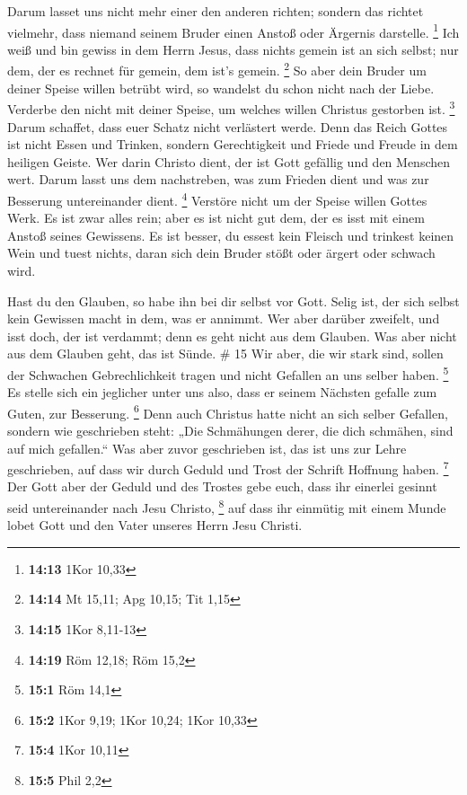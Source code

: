  Darum lasset uns nicht mehr einer den anderen richten;
sondern das richtet vielmehr, dass niemand seinem Bruder einen Anstoß
oder Ärgernis darstelle. \footnote{\textbf{14:13} 1Kor 10,33}
 Ich weiß und bin gewiss in dem Herrn Jesus, dass nichts
gemein ist an sich selbst; nur dem, der es rechnet für gemein, dem ist's
gemein. \footnote{\textbf{14:14} Mt 15,11; Apg 10,15; Tit 1,15}
 So aber dein Bruder um deiner Speise willen betrübt
wird, so wandelst du schon nicht nach der Liebe. Verderbe den nicht mit
deiner Speise, um welches willen Christus gestorben ist. \footnote{\textbf{14:15}
  1Kor 8,11-13}  Darum schaffet, dass euer Schatz nicht
verlästert werde.  Denn das Reich Gottes ist nicht Essen
und Trinken, sondern Gerechtigkeit und Friede und Freude in dem heiligen
Geiste.  Wer darin Christo dient, der ist Gott gefällig
und den Menschen wert.  Darum lasst uns dem nachstreben,
was zum Frieden dient und was zur Besserung untereinander dient.
\footnote{\textbf{14:19} Röm 12,18; Röm 15,2}  Verstöre
nicht um der Speise willen Gottes Werk. Es ist zwar alles rein; aber es
ist nicht gut dem, der es isst mit einem Anstoß seines Gewissens.
 Es ist besser, du essest kein Fleisch und trinkest
keinen Wein und tuest nichts, daran sich dein Bruder stößt oder ärgert
oder schwach wird.

 Hast du den Glauben, so habe ihn bei dir selbst vor
Gott. Selig ist, der sich selbst kein Gewissen macht in dem, was er
annimmt.  Wer aber darüber zweifelt, und isst doch, der
ist verdammt; denn es geht nicht aus dem Glauben. Was aber nicht aus dem
Glauben geht, das ist Sünde. \# 15  Wir aber, die wir
stark sind, sollen der Schwachen Gebrechlichkeit tragen und nicht
Gefallen an uns selber haben. \footnote{\textbf{15:1} Röm 14,1}
 Es stelle sich ein jeglicher unter uns also, dass er
seinem Nächsten gefalle zum Guten, zur Besserung. \footnote{\textbf{15:2}
  1Kor 9,19; 1Kor 10,24; 1Kor 10,33}  Denn auch Christus
hatte nicht an sich selber Gefallen, sondern wie geschrieben steht: „Die
Schmähungen derer, die dich schmähen, sind auf mich gefallen.``
 Was aber zuvor geschrieben ist, das ist uns zur Lehre
geschrieben, auf dass wir durch Geduld und Trost der Schrift Hoffnung
haben. \footnote{\textbf{15:4} 1Kor 10,11}  Der Gott aber
der Geduld und des Trostes gebe euch, dass ihr einerlei gesinnt seid
untereinander nach Jesu Christo, \footnote{\textbf{15:5} Phil 2,2}
 auf dass ihr einmütig mit einem Munde lobet Gott und den
Vater unseres Herrn Jesu Christi.

